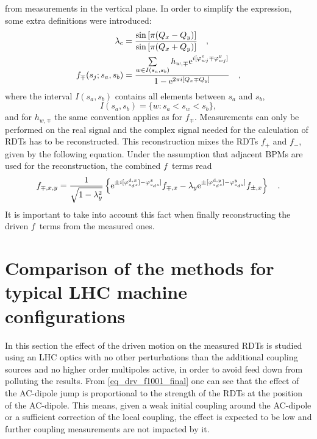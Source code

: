 %
from measurements in the vertical plane.
In order to simplify the expression, some extra definitions were introduced:
%
\begin{align}
    \lambda_c &= \frac{\sin\left[\pi(Q_x-Q_y)\right]}{\sin\left[\pi(Q_x+Q_y)\right]}\quad ,
    \notag \\
    f_{\mp}(s_j;s_a,s_b) &= \frac{
        \sum\limits_{w\in I(s_a,s_b)} h_{w,\mp}\text{e}^{i[\varphi_{wj}^x \mp \varphi_{wj}^y]}
    }{
        1-\text{e}^{2\pi i [Q_x\mp Q_y]}
    }\quad ,
\end{align}
%
where the interval $I(s_a,s_b)$  contains all elements between $s_a$ and $s_b$,
%
\begin{equation}
    I(s_a,s_b) = \{w: s_a < s_w < s_b\},
\end{equation}
%
and for $h_{w,\mp}$ the same convention applies as for $f_\mp$.
Measurements can only be performed on the real signal and the complex signal needed for the calculation
of RDTs has to be reconstructed.  
This reconstruction mixes the RDTs $f_+$ and $f_-$, given by the following equation. Under the assumption
that adjacent BPMs are used for the reconstruction, the combined $f$~terms read
%
\begin{align}
   f_{\mp,x,y} = \frac{1}{\sqrt{1-\lambda_y^2}}
   \left\{
       \text{e}^{\pm i [\varphi^{\text{d},x}_{s_ds}] - \varphi^{x}_{s_ds}]}f_{\mp,x}
       - \lambda_y\text{e}^{\pm[\varphi^{\text{d},y}_{s_ds}] - \varphi^{y}_{s_ds}]}f_{\pm,x}
    \right\}
    \quad .
\end{align}
%
It is important to take into account this fact when finally reconstructing the driven $f$~terms from
the measured ones.

\section{Comparison of the methods for typical LHC machine configurations}

In this section the effect of the driven motion on the measured RDTs is studied using an LHC optics with no other
perturbations than the additional coupling sources and no higher order multipoles active, in order to avoid feed
down from polluting the results.
From \eqref{eq_drv_f1001_final} one can see that the effect of the AC-dipole jump is proportional to
the strength of the RDTs at the  position of the AC-dipole.
This means, given a weak initial coupling around the AC-dipole or a sufficient
correction of the local coupling, the effect is expected to be low and further coupling measurements
are not impacted by it. 

